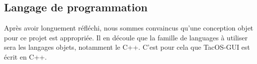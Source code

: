 \subsection{Langage de programmation}

Après avoir longuement réfléchi, nous sommes convaincus qu'une conception objet pour ce projet est appropriée.
Il en découle que la famille de languages à utiliser sera les langages objets, notamment le C++.
C'est pour cela que TacOS-GUI est écrit en C++.
